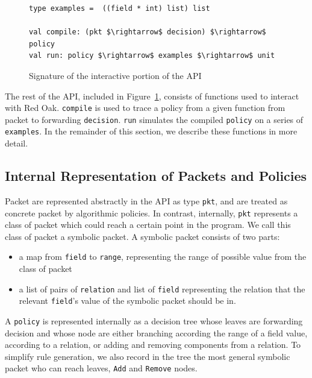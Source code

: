 \documentclass[preprint]{sigplanconf}
\begin{document}
\begin{figure}[ht]
  \begin{lstlisting}[mathescape]
type examples =  ((field * int) list) list
  
val compile: (pkt $\rightarrow$ decision) $\rightarrow$ policy
val run: policy $\rightarrow$ examples $\rightarrow$ unit
  \end{lstlisting}

  \caption{Signature of the interactive portion of the API}
  \label{fig:build_api}
\end{figure}


The rest of the API, included in Figure~\ref{fig:build_api}, consists of functions used to interact with Red Oak. \lstinline|compile| is used to trace a policy from a given function from packet to forwarding \lstinline|decision|. \lstinline|run| simulates the compiled \lstinline|policy| on a series of \lstinline|examples|. In the remainder of this section, we describe these functions in more detail.

\subsection*{Internal Representation of Packets and Policies}

Packet are represented abstractly in the API as type \lstinline|pkt|, and are treated as concrete packet by algorithmic policies. In contrast, internally, \lstinline|pkt| represents a class of packet which could reach a certain point in the program. We call this class of packet a symbolic packet.
A symbolic packet consists of two parts:
\begin{itemize}
\item a map from \lstinline|field| to \lstinline|range|, representing the range of possible value from the class of packet
  \item a list of pairs of \lstinline|relation| and list of \lstinline|field| representing the relation that the relevant \lstinline|field|'s value of the symbolic packet should be in. 
  \end{itemize}
  
A \lstinline|policy| is represented internally as a decision tree whose leaves are forwarding decision and whose node are either branching according the range of a field value, according to a relation, or adding and removing components from a relation. To simplify rule generation, we also record in the tree the most general symbolic packet who can reach leaves, \lstinline|Add| and \lstinline|Remove| nodes.
\end{document}
